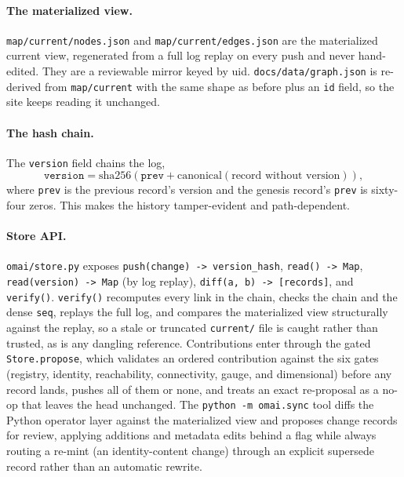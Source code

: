 \documentclass[11pt,a4paper]{article}
\begin{document}
\paragraph{The materialized view.} \texttt{map/current/nodes.json} and
\texttt{map/current/edges.json} are the materialized current view, regenerated
from a full log replay on every push and never hand-edited. They are a reviewable
mirror keyed by uid. \texttt{docs/data/graph.json} is re-derived from
\texttt{map/current} with the same shape as before plus an \texttt{id} field, so
the site keeps reading it unchanged.

\paragraph{The hash chain.} The \texttt{version} field chains the log,
\[
  \texttt{version} = \mathrm{sha256}(\texttt{prev} + \mathrm{canonical}(\text{record without version})),
\]
where \texttt{prev} is the previous record's version and the genesis record's
\texttt{prev} is sixty-four zeros. This makes the history tamper-evident and
path-dependent.

\paragraph{Store API.} \texttt{omai/store.py} exposes
\texttt{push(change) -> version\_hash}, \texttt{read() -> Map},
\texttt{read(version) -> Map} (by log replay), \texttt{diff(a, b) -> [records]},
and \texttt{verify()}. \texttt{verify()} recomputes every link in the chain,
checks the chain and the dense \texttt{seq}, replays the full log, and compares the
materialized view structurally against the replay, so a stale or truncated
\texttt{current/} file is caught rather than trusted, as is any dangling
reference. Contributions enter through the gated \texttt{Store.propose}, which
validates an ordered contribution against the six gates (registry, identity,
reachability, connectivity, gauge, and dimensional) before any record lands,
pushes all of them or none, and treats an exact re-proposal as a no-op that
leaves the head unchanged. The \texttt{python -m omai.sync} tool diffs the
Python operator layer against the materialized view and proposes change records
for review, applying additions and metadata edits behind a flag while always
routing a re-mint (an identity-content change) through an explicit supersede
record rather than an automatic rewrite.
\end{document}
